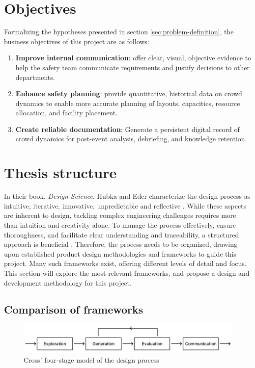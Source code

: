 \section{Objectives}
\label{sec:objectives}

Formalizing the hypotheses presented in section \ref{sec:problem-definition}, the business objectives of this project are as follows:
\begin{enumerate}
  \item \textbf{Improve internal communication}: offer clear, visual, objective evidence to help the safety team communicate requirements and justify decisions to other departments.
  \item \textbf{Enhance safety planning}: provide quantitative, historical data on crowd dynamics to enable more accurate planning of layouts, capacities, resource allocation, and facility placement.
  \item \textbf{Create reliable documentation}: Generate a persistent digital record of crowd dynamics for post-event analysis, debriefing, and knowledge retention.
\end{enumerate}


\section{Thesis structure}

In their book, \textit{Design Science}, Hubka and Eder characterize the design process as intuitive, iterative, innovative, unpredictable and reflective \cite{hubka_eder}. While these aspects are inherent to design, tackling complex engineering challenges requires more than intuition and creativity alone. To manage the process effectively, ensure thoroughness, and facilitate clear understanding and traceability, a structured approach is beneficial \cite{eder}. Therefore, the process needs to be organized, drawing upon established product design methodologies and frameworks to guide this project. Many such frameworks exist, offering different levels of detail and focus. This section will explore the most relevant frameworks, and propose a design and development methodology for this project.

\subsection{Comparison of frameworks}
\vspace{2em}
\begin{figure}[H]
  \centering
  \includegraphics[width=\textwidth]{Pictures/Figures/cross.png}
  \caption{Cross' four-stage model of the design process}
  \label{fig:cross}
\end{figure}

